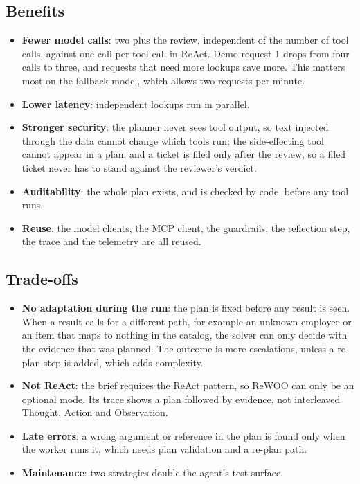 \documentclass[11pt,letterpaper]{article}
\renewcommand{\_}{\textunderscore\allowbreak}
\begin{document}
\subsection*{Benefits}
\begin{itemize}
  \item \textbf{Fewer model calls}: two plus the review, independent of the number of tool
  calls, against one call per tool call in ReAct. Demo request 1 drops from four calls to three,
  and requests that need more lookups save more. This matters most on the fallback model, which
  allows two requests per minute.
  \item \textbf{Lower latency}: independent lookups run in parallel.
  \item \textbf{Stronger security}: the planner never sees tool output, so text injected through
  the data cannot change which tools run; the side-effecting tool cannot appear in a plan; and a
  ticket is filed only after the review, so a filed ticket never has to stand against the
  reviewer's verdict.
  \item \textbf{Auditability}: the whole plan exists, and is checked by code, before any tool
  runs.
  \item \textbf{Reuse}: the model clients, the MCP client, the guardrails, the reflection step,
  the trace and the telemetry are all reused.
\end{itemize}

\subsection*{Trade-offs}
\begin{itemize}
  \item \textbf{No adaptation during the run}: the plan is fixed before any result is seen. When
  a result calls for a different path, for example an unknown employee or an item that maps to
  nothing in the catalog, the solver can only decide with the evidence that was planned. The
  outcome is more escalations, unless a re-plan step is added, which adds complexity.
  \item \textbf{Not ReAct}: the brief requires the ReAct pattern, so ReWOO can only be an optional
  mode. Its trace shows a plan followed by evidence, not interleaved Thought, Action and
  Observation.
  \item \textbf{Late errors}: a wrong argument or reference in the plan is found only when the
  worker runs it, which needs plan validation and a re-plan path.
  \item \textbf{Maintenance}: two strategies double the agent's test surface.
\end{itemize}
\end{document}
